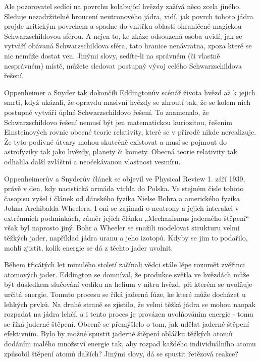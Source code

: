   Ale pozorovatel sedící na povrchu kolabující hvězdy zažívá něco zcela jiného. Sleduje
  nezadržitelné hroucení neutronového jádra, vidí, jak povrch tohoto jádra projde kritickým povrchem
  a spadne do vnitřku oblasti ohraničené magickou Schwarzschildovou sférou. A nejen to, ke zkáze
  odsouzená osoba uvidí, jak se vytváří obávaná Schwarzschildova sféra, tato hranice nenávratna,
  zpoza které se nic nemůže dostat ven. Jinými slovy, sedíte-li na správném (či vlastně nesprávném)
  místě, můžete sledovat postupný vývoj celého Schwarzschildova řešení. 
  
  Oppenheimer a Snyder tak dokončili Eddingtonův scénář života hvězd až k jejich smrti, když
  ukázali, že opravdu masivní hvězdy se zhroutí tak, že se kolem nich postupně vytváří úplné
  Schwarzschildovo řešení. To znamenalo, že Schwarzschildovo řešení nemusí být jen matematickou
  kuriozitou, řešením Einsteinových rovnic obecné teorie relativity, které se v přírodě nikde
  nerealizuje. Že tyto podivné útvary mohou skutečně existovat a musí se pojmout do astrofyziky tak
  jako hvězdy, planety či komety. Obecná teorie relativity tak odhalila další zvláštní a
  neočekávanou vlastnost vesmíru. 
  
  Oppenheimerův a Snyderův článek se objevil ve Physical Review 1. září 1939, právě v den, kdy
  nacistická armáda vtrhla do Polska. Ve stejném čísle tohoto časopisu vyšel i článek od dánského
  fyzika Nielse Bohra a amerického fyzika Johna Archibalda Wheelera. I oni se zajímali o neutrony a
  jejich interakci v extrémních podmínkách, záměr jejich článku „Mechanismus jaderného štěpení“ však
  byl naprosto jiný. Bohr a Wheeler se snažili modelovat strukturu velmi těžkých jader, například
  jádra uranu a jeho izotopů. Kdyby se jim to podařilo, mohli zjistit, kolik energie se dá z těchto
  jader uvolnit. 
  
  Během třicátých let minulého století začínali vědci stále lépe rozumět zvěřinci atomových jader.
  Eddington se domníval, že produkce světla ve hvězdách může být důsledkem slučování vodíku na
  helium v nitru hvězd, při kterém se uvolňuje určitá energie. Tomuto procesu se říká jaderná fúze,
  ke které může docházet u lehkých prvků. Na druhé straně se zjistilo, že velmi těžká jádra se mohou
  naopak rozpadat na jádra lehčí, a i tento proces je provázen uvolňováním energie - tomu se říká
  jaderné štěpení. Obecně se přemýšlelo o tom, jak udělat jaderné štěpení efektivním. Bylo by možné
  spustit jaderné štěpení obláčku těžkých atomů dodáním malého množství energie tak, aby rozpad
  každého individuálního atomu způsobil štěpení atomů dalších? Jinými slovy, dá se spustit řetězová
  reakce? 
  
